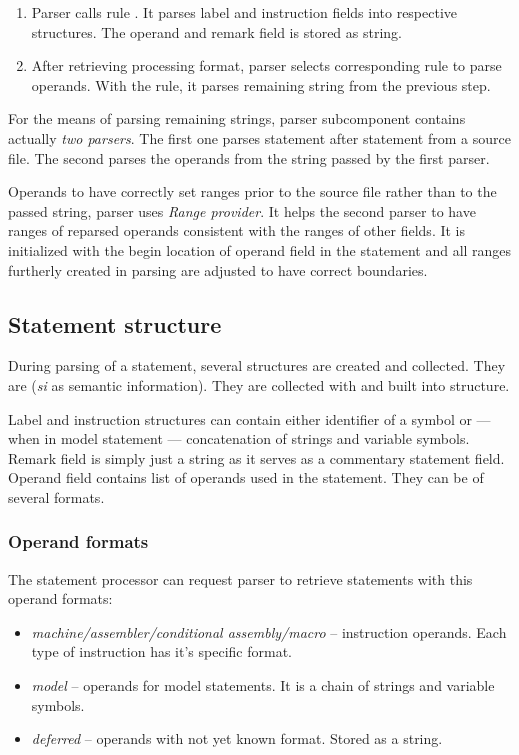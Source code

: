 \begin{enumerate}
	\item Parser calls rule . It parses label and instruction fields into respective structures. The operand and remark field is stored as string.
	\item After retrieving processing format, parser selects corresponding rule to parse operands. With the rule, it parses remaining string from the previous step.
\end{enumerate}

For the means of parsing remaining strings, parser subcomponent contains actually \emph{two parsers}. The first one parses statement after statement from a source file. The second parses the operands from the string passed by the first parser. 

Operands to have correctly set ranges prior to the source file rather than to the passed string, parser uses \emph{Range provider}. It helps the second parser to have ranges of reparsed operands consistent with the ranges of other fields. It is initialized with the begin location of operand field in the statement and all ranges furtherly created in parsing are adjusted to have correct boundaries.

\subsection{Statement structure}

During parsing of a statement, several structures are created and collected. They are  (\emph{si} as semantic information). They are collected with  and built into  structure.

Label and instruction structures can contain either identifier of a symbol or --- when in model statement --- concatenation of strings and variable symbols. Remark field is simply just a string as it serves as a commentary statement field. Operand field contains list of operands used in the statement. They can be of several formats.

\subsubsection{Operand formats}
The statement processor can request parser to retrieve statements with this operand formats:
\begin{itemize}
	\item \emph{machine/assembler/conditional assembly/macro} -- instruction operands. Each type of instruction has it's specific format.
	\item \emph{model} -- operands for model statements. It is a chain of strings and variable symbols.
	\item \emph{deferred} -- operands with not yet known format. Stored as a string.
\end{itemize}

